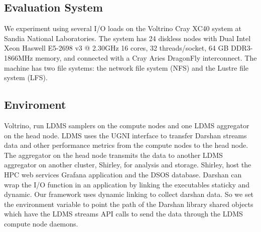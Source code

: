 \subsection{Evaluation System}
We experiment using several I/O loads on the Voltrino Cray XC40 system at Sandia National Laboratories. The system has 24  diskless nodes with Dual Intel Xeon Haswell E5-2698 v3 @ 2.30GHz 16 cores, 32 threads/socket, 64 GB DDR3-1866MHz memory, and connected with a Cray Aries DragonFly interconnect. The machine has two file systems: the network file system (NFS) and the Lustre file system (LFS).

\subsection{Enviroment}
Voltrino, run LDMS samplers on the compute nodes and one LDMS aggregator on the head node. LDMS uses the UGNI interface to transfer Darshan streams data and other performance metrics from the compute nodes to the head node. The aggregator on the head node transmits the data to another LDMS aggregator on another cluster, Shirley, for analysis and storage. Shirley, host the HPC web services Grafana application and the DSOS database. Darshan can wrap the I/O function in an application by linking the executables staticky and dynamic. Our framework uses dynamic linking to collect darshan data. So we set the  environment variable to point the path of the Darshan library shared objects which have the LDMS streams API calls to send the data through the LDMS compute node daemons. 

